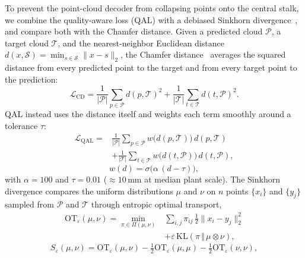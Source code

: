 \documentclass[10pt,twocolumn,letterpaper]{article}
\begin{document}
To prevent the point-cloud decoder from collapsing points onto the central stalk, we combine the quality-aware loss (QAL)
with a debiased Sinkhorn divergence~\cite{feydy2019sinkhorn}, and compare both with the Chamfer distance. Given a predicted
cloud $\mathcal{P}$, a target cloud $\mathcal{T}$, and the nearest-neighbor Euclidean distance
$d(x,\mathcal{S}) = \min_{s\in\mathcal{S}} \|x-s\|_2$, the Chamfer distance~\cite{fan2017pcgn} averages the squared distance from every
predicted point to the target and from every target point to the prediction:
\begin{equation}
  \mathcal{L}_{\mathrm{CD}} = \frac{1}{|\mathcal{P}|}\sum_{p\in\mathcal{P}} d(p,\mathcal{T})^2
    + \frac{1}{|\mathcal{T}|}\sum_{t\in\mathcal{T}} d(t,\mathcal{P})^2.
  \label{eq:cd}
\end{equation}
QAL instead uses the distance itself and weights each term smoothly around a tolerance $\tau$:
\begin{equation}
  \begin{aligned}
    \mathcal{L}_{\mathrm{QAL}} ={}& \frac{1}{|\mathcal{P}|}\sum_{p\in\mathcal{P}} w\big(d(p,\mathcal{T})\big)\,d(p,\mathcal{T})\\
      &+ \frac{1}{|\mathcal{T}|}\sum_{t\in\mathcal{T}} w\big(d(t,\mathcal{P})\big)\,d(t,\mathcal{P}),
  \end{aligned}
  \label{eq:qal}
\end{equation}
\begin{equation}
  w(d) = \sigma\big(\alpha\,(d-\tau)\big),
  \label{eq:qal_w}
\end{equation}
with $\alpha = 100$ and $\tau = 0.01$ ($\approx 10$\,mm at median plant scale). The Sinkhorn divergence compares the
uniform distributions $\mu$ and $\nu$ on $n$ points $\{x_i\}$ and $\{y_j\}$ sampled from $\mathcal{P}$ and $\mathcal{T}$
through entropic optimal transport,
\begin{equation}
  \begin{aligned}
    \mathrm{OT}_\varepsilon(\mu,\nu) = \min_{\pi\in\Pi(\mu,\nu)} &\sum_{i,j}\pi_{ij}\,\tfrac12\lVert x_i-y_j\rVert_2^2\\
      &+ \varepsilon\,\mathrm{KL}(\pi\,\Vert\,\mu\otimes\nu),
  \end{aligned}
  \label{eq:ot}
\end{equation}
\begin{equation}
  S_\varepsilon(\mu,\nu) = \mathrm{OT}_\varepsilon(\mu,\nu) - \tfrac12\mathrm{OT}_\varepsilon(\mu,\mu)
    - \tfrac12\mathrm{OT}_\varepsilon(\nu,\nu),
  \label{eq:sink}
\end{equation}
\end{document}
